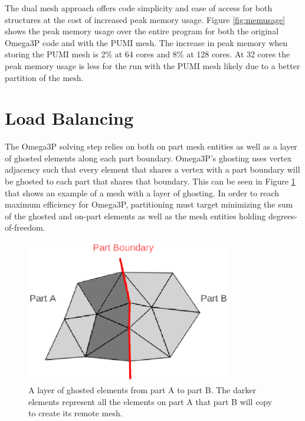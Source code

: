 \documentclass[a4paper]{article}
\begin{document}
The dual mesh approach offers code simplicity and 
ease of access for both structures at the cost of increased peak memory usage. 
Figure \ref{fig:memusage} shows the peak memory usage over the entire program for both
the original Omega3P code and with the PUMI mesh. The increase in peak memory when 
storing the PUMI mesh is 2\% at 64 cores and 8\% at 128 cores. At 32 cores the 
peak memory usage is less for the run with the PUMI mesh likely due to a better 
partition of the mesh. 

\section{Load Balancing}\label{sec:parma}

The Omega3P solving step relies on both on part mesh entities as well as a layer of 
ghosted elements along each part boundary. Omega3P's ghosting uses vertex adjacency such
that every element that shares a vertex with a part boundary will be ghosted to each part that shares that boundary. This can be seen in Figure \ref{fig:ghost3} that shows an 
example of a mesh with a layer of ghosting. In order to reach maximum efficiency
for Omega3P, partitioning must target minimizing the sum of the 
ghosted and on-part elements as well as the mesh entities holding degrees-of-freedom.

\begin{figure}[ht]
\centering
\includegraphics[width=0.8\textwidth]{ghost.eps} 
\caption{\label{fig:ghost3} A layer of ghosted elements from part A to part B. The darker elements represent all the elements on part A that part B will copy to create its remote mesh.}
\end{figure}
\end{document}
